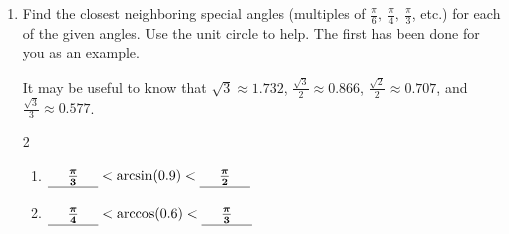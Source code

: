 \documentclass{article}
\begin{document}
\begin{enumerate}[topsep=0pt]
\begin{enumerate}





  \item Find the closest neighboring special angles (multiples of $\frac{\pi}{6},\ \frac{\pi}{4},\ \frac{\pi}{3}$, etc.) for each of the given angles. Use the unit circle to help. The first has been done for you as an example.
  
  It may be useful to know that $\sqrt{3}\approx 1.732$, $\frac{\sqrt3}{2}\approx 0.866$, $\frac{\sqrt2}{2}\approx 0.707$, and $\frac{\sqrt3}{3} \approx 0.577$.

  \pspace{12pt}
  
\begin{multicols}{2}

      \begin{enumerate}
      \vspace{12pt}
      \item
\begin{problem}[0.5in]
$\cfitb[\dfrac{\pi}{3}\vphantom{\dfrac{\pi}{3}}]{0.5in}{\frac{\pi}{3}} < \arcsin (0.9) < \cfitb[\dfrac{\pi}{2}\vphantom{\dfrac{\pi}{3}}]{0.5in}{\frac{\pi}{2}}$ 
        \end{problem}
        
      \item
\begin{problem}[0.5in]
$\cfitb[\vphantom{\dfrac{\pi}{3}}]{0.5in}{\frac{\pi}{4}} < \arccos (0.6) < \cfitb[\vphantom{\dfrac{\pi}{3}}]{0.5in}{\frac{\pi}{3}}$ 
        \end{problem}


\end{enumerate}
\end{multicols}
\end{enumerate}
\end{enumerate}
\end{document}
